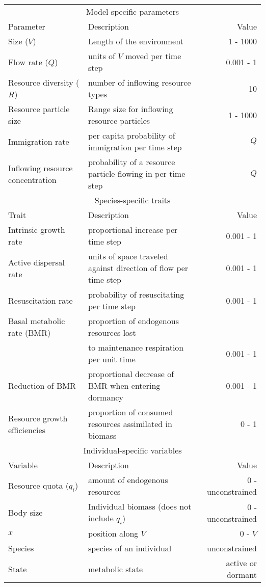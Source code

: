 \documentclass{article}
\begin{document}
\oddsidemargin-1cm
\textwidth19cm

\begin{tabular}{llr}
\hline
\multicolumn{3}{c}{Model-specific parameters} \\

\cline{1-3}
Parameter & Description & Value \\
\hline
Size ($V$) & Length of the environment & 1 - 1000 \\
Flow rate ($Q$) & units of $V$ moved per time step & 0.001 - 1 \\
Resource diversity ($R$) & number of inflowing resource types & 10 \\
Resource particle size & Range size for inflowing resource particles & 1 - 1000 \\
Immigration rate & per capita probability of immigration per time step  & $Q$ \\
Inflowing resource concentration & probability of a resource particle flowing in per time step & $Q$ \\  
\hline
\multicolumn{3}{c}{Species-specific traits} \\

\cline{1-3}
Trait & Description & Value \\
\hline
Intrinsic growth rate & proportional increase per time step & 0.001 - 1 \\
Active dispersal rate & units of space traveled against direction of flow per time step & 0.001 - 1 \\
Resuscitation rate & probability of resuscitating per time step & 0.001 - 1 \\
Basal metabolic rate (BMR) & proportion of endogenous resources lost \\
 & to maintenance respiration per unit time & 0.001 - 1 \\
Reduction of BMR & proportional decrease of BMR when entering dormancy  & 0.001 - 1 \\
Resource growth efficiencies & proportion of consumed resources assimilated in biomass  & 0 - 1 \\
\hline
\multicolumn{3}{c}{Individual-specific variables} \\

\cline{1-3}
Variable & Description & Value \\
\hline
Resource quota ($q_i$)  & amount of endogenous resources & 0 - unconstrained \\
Body size & Individual biomass (does not include $q_i$) & 0 - unconstrained \\
$x$ & position along $V$  & 0 - $V$      \\
Species & species of an individual & unconstrained \\
State & metabolic state & active or dormant \\
\hline

\end{tabular}
\end{document}
